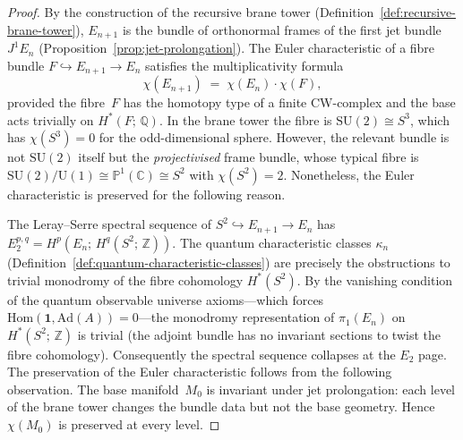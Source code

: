 \begin{proof}
By the construction of the recursive brane tower
(Definition~\ref{def:recursive-brane-tower}), $E_{n+1}$ is the bundle of
orthonormal frames of the first jet bundle $J^1 E_n$
(Proposition~\ref{prop:jet-prolongation}).  The Euler characteristic of a
fibre bundle $F \hookrightarrow E_{n+1} \to E_n$ satisfies the
multiplicativity formula
\[
  \chi(E_{n+1}) \;=\; \chi(E_n) \cdot \chi(F),
\]
provided the fibre~$F$ has the homotopy type of a finite CW-complex and the
base acts trivially on $H^*(F;\, \mathbb{Q})$.  In the brane tower the fibre
is $\mathrm{SU}(2) \cong S^3$, which has $\chi(S^3) = 0$ for the odd-dimensional
sphere.  However, the relevant bundle is not $\mathrm{SU}(2)$ itself but the
\emph{projectivised} frame bundle, whose typical fibre is
$\mathrm{SU}(2)/\mathrm{U}(1) \cong \mathbb{P}^1(\mathbb{C}) \cong S^2$ with
$\chi(S^2) = 2$.  Nonetheless, the Euler characteristic is preserved for the
following reason.

The Leray--Serre spectral sequence of
$S^2 \hookrightarrow E_{n+1} \to E_n$ has $E_2^{p,q} = H^p(E_n;\,
H^q(S^2;\, \mathbb{Z}))$.  The quantum characteristic classes $\kappa_n$
(Definition~\ref{def:quantum-characteristic-classes}) are precisely the
obstructions to trivial monodromy of the fibre cohomology $H^*(S^2)$.  By
the vanishing condition of the quantum observable universe axioms---which
forces $\mathrm{Hom}(\mathbf{1}, \mathrm{Ad}(A)) = 0$---the monodromy
representation of $\pi_1(E_n)$ on $H^*(S^2;\, \mathbb{Z})$ is trivial (the
adjoint bundle has no invariant sections to twist the fibre cohomology).
Consequently the spectral sequence collapses at the $E_2$ page.  The
preservation of the Euler characteristic follows from the following
observation.  The base manifold~$M_0$ is invariant under jet prolongation:
each level of the brane tower changes the bundle data but not the base
geometry.  Hence $\chi(M_0)$ is preserved at every level.
\end{proof}

